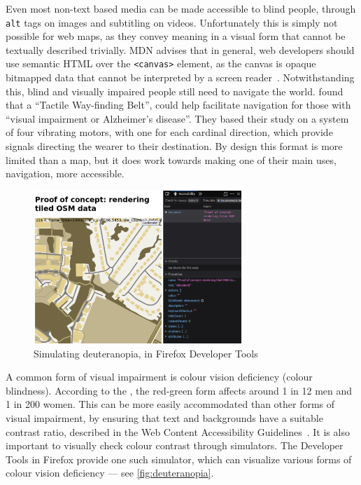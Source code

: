 \documentclass[hyphens]{final_report}
\begin{document}
Even most non-text based media can be made accessible to blind people, through \texttt{alt} tags on images and subtitling on videos. Unfortunately this is simply not possible for web maps, as they convey meaning in a visual form that cannot be textually described trivially. MDN advises that in general, web developers should use semantic HTML over the \texttt{<canvas>} element, as the canvas is opaque bitmapped data that cannot be interpreted by a screen reader~\cite{mdn-element-reference-canvas}. Notwithstanding this, blind and visually impaired people still need to navigate the world. \textcite{accessible-wayfinding-belt} found that a ``Tactile Way-finding Belt'', could help facilitate navigation for those with ``visual impairment or Alzheimer’s disease''. They based their study on a system of four vibrating motors, with one for each cardinal direction, which provide signals directing the wearer to their destination. By design this format is more limited than a map, but it does work towards making one of their main uses, navigation, more accessible.

\begin{figure}[ht]
    \centering
    \includegraphics[width=0.7\textwidth]{images/simulated-deuteranopia.png}
    \caption{Simulating deuteranopia, in Firefox Developer Tools}\label{fig:deuteranopia}
\end{figure}

A common form of visual impairment is colour vision deficiency (colour blindness). According to the \textcite{nhs-colour-vision-deficiency}, the red-green form affects around 1 in 12 men and 1 in 200 women. This can be more easily accommodated than other forms of visual impairment, by ensuring that text and backgrounds have a suitable contrast ratio, described in the Web Content Accessibility Guidelines~\cite{w3c-wcag}. It is also important to visually check colour contrast through simulators. The Developer Tools in Firefox provide one such simulator, which can visualize various forms of colour vision deficiency --- see \autoref{fig:deuteranopia}.
\end{document}
